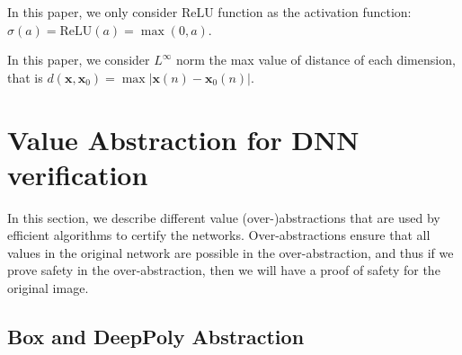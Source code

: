 \documentclass{llncs}
\newcommand{\ReLU}{\mathrm{ReLU}}
\begin{document}
In this paper, we only consider $\ReLU$ function as the activation function: $\sigma(a)=\ReLU(a)=\max(0,a)$. 

In this paper, we consider $L^{\infty}$ norm the max value of distance of each dimension, that is $d(\boldsymbol{x},\boldsymbol{x}_0)=\max |\boldsymbol{x}(n)-\boldsymbol{x}_0(n)|$. 
\fi


\section{Value Abstraction for DNN verification}

In this section, we describe different value (over-)abstractions that are used by efficient algorithms to certify the networks. Over-abstractions ensure that all values in the original network are possible in the over-abstraction, and thus if we prove safety in the over-abstraction, then we will have a proof of safety for the original image.

\subsection{Box and DeepPoly Abstraction}

	
\end{document}
